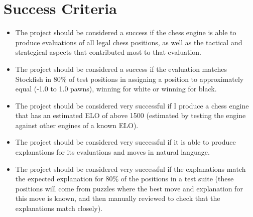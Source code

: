 \documentclass[12pt,a4paper]{article}
\begin{document}
\section*{Success Criteria}
\begin{itemize}
    \item The project should be considered a success if the chess engine is able to produce evaluations of all legal chess positions, as well as the tactical and strategical aspects that contributed most to that evaluation. 
    \item The project should be considered a success if the evaluation matches Stockfish in 80\% of test positions in assigning a position to approximately equal (-1.0 to 1.0 pawns), winning for white or winning for black.
    \item The project should be considered very successful if I produce a chess engine that has an estimated ELO of above 1500 (estimated by testing the engine against other engines of a known ELO).
    \item The project should be considered very successful if it is able to produce explanations for its evaluations and moves in natural language.
    \item The project should be considered very successful if the explanations match the expected explanation for 80\% of the positions in a test suite (these positions will come from puzzles where the best move and explanation for this move is known, and then manually reviewed to check that the explanations match closely).
\end{itemize}
\end{document}
